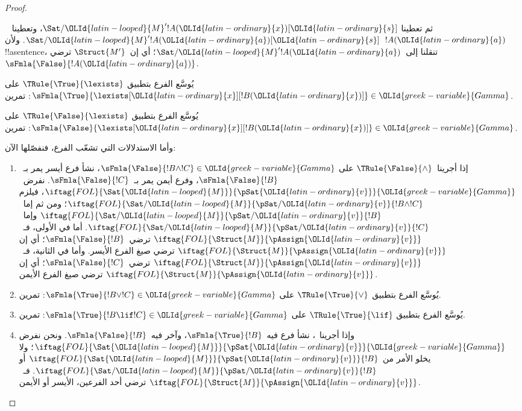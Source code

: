 \documentclass[../../../include/open-logic-section]{subfiles}
\begin{document}
\begin{proof}
\begin{enumerate}
{  ثم تعطينا 
  $\Sat/{\OLId{latin-looped}{M}'}{!A(\OLId{latin-ordinary}{x})}[\OLId{latin-ordinary}{s}]$، وتعطينا
  ~$\Sat/{\OLId{latin-looped}{M}'}{!A(\OLId{latin-ordinary}{a})}[\OLId{latin-ordinary}{s}]$.
  ولأن~$!A(\OLId{latin-ordinary}{a})$ !!a{sentence}، تنقلنا
   إلى~$\Sat/{\OLId{latin-looped}{M}'}{!A(\OLId{latin-ordinary}{a})}$؛
  أي إن~$\Struct{M'}$ ترضي~$\sFmla{\False}{!A(\OLId{latin-ordinary}{a})}$.
\item يُوسَّع الفرع بتطبيق $\TRule{\True}{\lexists}$ على
  $\sFmla{\True}{\lexists[\OLId{latin-ordinary}{x}][!B(\OLId{latin-ordinary}{x})]} \in \OLId{greek-variable}{Gamma}$: تمرين.
\item يُوسَّع الفرع بتطبيق $\TRule{\False}{\lexists}$ على
  $\sFmla{\False}{\lexists[\OLId{latin-ordinary}{x}][!B(\OLId{latin-ordinary}{x})]} \in \OLId{greek-variable}{Gamma}$: تمرين.}{}
\end{enumerate}
وأما الاستدلالات التي تشعّب الفرع، فنفصّلها الآن:
\begin{enumerate}
\item إذا أجرينا~$\TRule{\False}{\land}$ على
  $\sFmla{\False}{!B \land !C} \in \OLId{greek-variable}{Gamma}$،
  نشأ فرع أيسر يمر بـ~$\sFmla{\False}{!B}$،
  وفرع أيمن يمر بـ~$\sFmla{\False}{!C}$.
  نفرض~$\iftag{FOL}{\Sat{\OLId{latin-looped}{M}}}{\pSat{\OLId{latin-ordinary}{v}}}{\OLId{greek-variable}{Gamma}}$، فيلزم
  $\iftag{FOL}{\Sat/{\OLId{latin-looped}{M}}}{\pSat/{\OLId{latin-ordinary}{v}}}{!B \land !C}$؛
  ومن ثم إما~$\iftag{FOL}{\Sat/{\OLId{latin-looped}{M}}}{\pSat/{\OLId{latin-ordinary}{v}}}{!B}$
  وإما~$\iftag{FOL}{\Sat/{\OLId{latin-looped}{M}}}{\pSat/{\OLId{latin-ordinary}{v}}}{!C}$.
  أما في الأولى، فـ~$\iftag{FOL}{\Struct{M}}{\pAssign{\OLId{latin-ordinary}{v}}}$
  ترضي~$\sFmla{\False}{!B}$؛ أي إن
  $\iftag{FOL}{\Struct{M}}{\pAssign{\OLId{latin-ordinary}{v}}}$ ترضي صيغ الفرع الأيسر.
  وأما في الثانية، فـ~$\iftag{FOL}{\Struct{M}}{\pAssign{\OLId{latin-ordinary}{v}}}$
  ترضي~$\sFmla{\False}{!C}$؛ أي إن
  $\iftag{FOL}{\Struct{M}}{\pAssign{\OLId{latin-ordinary}{v}}}$ ترضي صيغ الفرع الأيمن.
\item يُوسَّع الفرع بتطبيق $\TRule{\True}{\lor}$ على
  $\sFmla{\True}{!B \lor !C} \in \OLId{greek-variable}{Gamma}$: تمرين.
\item يُوسَّع الفرع بتطبيق $\TRule{\True}{\lif}$ على
  $\sFmla{\True}{!B \lif !C} \in \OLId{greek-variable}{Gamma}$: تمرين.
\item وإذا أجرينا~\Cut، نشأ فرع فيه~$\sFmla{\True}{!B}$،
  وآخر فيه~$\sFmla{\False}{!B}$. ونحن نفرض
  $\iftag{FOL}{\Sat{\OLId{latin-looped}{M}}}{\pSat{\OLId{latin-ordinary}{v}}}{\OLId{greek-variable}{Gamma}}$؛ ولا يخلو الأمر من
  $\iftag{FOL}{\Sat{\OLId{latin-looped}{M}}}{\pSat{\OLId{latin-ordinary}{v}}}{!B}$ أو
  $\iftag{FOL}{\Sat/{\OLId{latin-looped}{M}}}{\pSat/{\OLId{latin-ordinary}{v}}}{!B}$.
  فـ~$\iftag{FOL}{\Struct{M}}{\pAssign{\OLId{latin-ordinary}{v}}}$ ترضي أحد الفرعين،
  الأيسر أو الأيمن.
\end{enumerate}
\end{proof}
\end{document}
